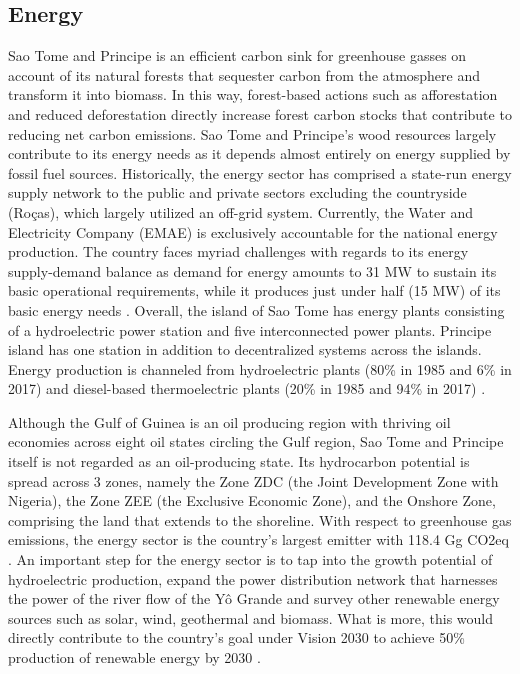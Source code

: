 \documentclass[
]{book}
\begin{document}
\hypertarget{energy-1}{%
\subsection{Energy}\label{energy-1}}

Sao Tome and Principe is an efficient carbon sink for greenhouse gasses on account of its natural forests that sequester carbon from the atmosphere and transform it into biomass. In this way, forest-based actions such as afforestation and reduced deforestation directly increase forest carbon stocks that contribute to reducing net carbon emissions. Sao Tome and Principe's wood resources largely contribute to its energy needs as it depends almost entirely on energy supplied by fossil fuel sources. Historically, the energy sector has comprised a state-run energy supply network to the public and private sectors excluding the countryside (Roças), which largely utilized an off-grid system. Currently, the Water and Electricity Company (EMAE) is exclusively accountable for the national energy production. The country faces myriad challenges with regards to its energy supply-demand balance as demand for energy amounts to 31 MW to sustain its basic operational requirements, while it produces just under half (15 MW) of its basic energy needs . Overall, the island of Sao Tome has energy plants consisting of a hydroelectric power station and five interconnected power plants. Principe island has one station in addition to decentralized systems across the islands. Energy production is channeled from hydroelectric plants (80\% in 1985 and 6\% in 2017) and diesel-based thermoelectric plants (20\% in 1985 and 94\% in 2017) .

Although the Gulf of Guinea is an oil producing region with thriving oil economies across eight oil states circling the Gulf region, Sao Tome and Principe itself is not regarded as an oil-producing state. Its hydrocarbon potential is spread across 3 zones, namely the Zone ZDC (the Joint Development Zone with Nigeria), the Zone ZEE (the Exclusive Economic Zone), and the Onshore Zone, comprising the land that extends to the shoreline. With respect to greenhouse gas emissions, the energy sector is the country's largest emitter with 118.4 Gg CO2eq . An important step for the energy sector is to tap into the growth potential of hydroelectric production, expand the power distribution network that harnesses the power of the river flow of the Yô Grande and survey other renewable energy sources such as solar, wind, geothermal and biomass. What is more, this would directly contribute to the country's goal under Vision 2030 to achieve 50\% production of renewable energy by 2030 .
\end{document}
